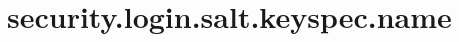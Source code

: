 \section{security.login.salt.keyspec.name}
\label{configuration:SecurityLoginSaltKeyspecName}
\AvailableInJavaOnly{\TODO}